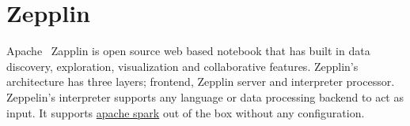 \section{Zepplin}

Apache~ Zapplin is open source web based notebook
that has built in data discovery, exploration, visualization and collaborative
features. Zepplin’s architecture has three layers; frontend, Zepplin server and
interpreter processor. Zeppelin’s interpreter supports any language or data
processing backend to act as input. It supports
\href{https://en.wikipedia.org/wiki/Apache_Spark}{apache spark} out of the box
without any configuration.
